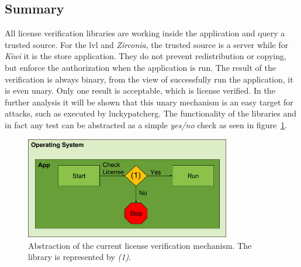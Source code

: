 \subsection{Summary} \label{section:license-abstraction}
All license verification libraries are working inside the application and query a trusted source.
For the \gls{lvl} and \textit{Zirconia}, the trusted source is a server while for \textit{Kiwi} it is the store application.
They do not prevent redistribution or copying, but enforce the authorization when the application is run.
The result of the verification is always binary, from the view of successfully run the application, it is even unary.
Only one result is acceptable, which is license verified.
In the further analysis it will be shown that this unary mechanism is an easy target for attacks, such as executed by \gls{luckypatcherg}.
\newline
The functionality of the libraries and in fact any test can be abstracted as a simple \textit{yes/no} check as seen in figure~\ref{fig:verificationNow}.
\begin{figure}[h]
    \centering
    \includegraphics[width=0.8\textwidth]{data/verificationNow.png}
    \caption{Abstraction of the current license verification mechanism. The library is represented by \textit{(1)}.}
    \label{fig:verificationNow}
\end{figure}
